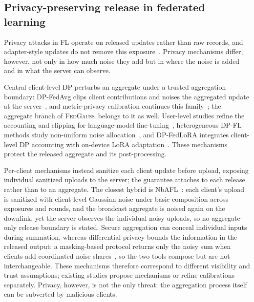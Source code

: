 \documentclass[a4paper,fleqn]{cas-dc}
\newcommand{\method}{\textsc{FedGauss}}
\begin{document}
\subsection{Privacy-preserving release in federated learning}
\par
Privacy attacks in FL operate on released updates rather than raw records, and adapter-style updates do not remove this exposure~\cite{shokri2017membership,nasr2019comprehensive,zhu2019deep,geiping2020inverting,carlini2022membership,tan2024reconstruction,sami2025adapter}. Privacy mechanisms differ, however, not only in how much noise they add but in where the noise is added and in what the server can observe.
\par
Central client-level DP perturbs an aggregate under a trusted aggregation boundary: DP-FedAvg clips client contributions and noises the aggregated update at the server~\cite{mcmahan2018dpfedavg}, and metric-privacy calibration continues this family~\cite{sainz2026metric}; the aggregate branch of \method\ belongs to it as well. User-level studies refine the accounting and clipping for language-model fine-tuning~\cite{chua2024mind,charles2024user}, heterogeneous DP-FL methods study non-uniform noise allocation~\cite{malek2024noiseaware}, and DP-FedLoRA integrates client-level DP accounting with on-device LoRA adaptation~\cite{xu2025dpfedlora}. These mechanisms protect the released aggregate and its post-processing.
\par
Per-client mechanisms instead sanitize each client update before upload, exposing individual sanitized uploads to the server; the guarantee attaches to each release rather than to an aggregate. The closest hybrid is NbAFL~\cite{wei2020federateddp}: each client's upload is sanitized with client-level Gaussian noise under basic composition across exposures and rounds, and the broadcast aggregate is noised again on the downlink, yet the server observes the individual noisy uploads, so no aggregate-only release boundary is stated. Secure aggregation can conceal individual inputs during summation, whereas differential privacy bounds the information in the released output: a masking-based protocol returns only the noisy sum when clients add coordinated noise shares~\cite{bonawitz2017secure}, so the two tools compose but are not interchangeable. These mechanisms therefore correspond to different visibility and trust assumptions; existing studies propose mechanisms or refine calibrations separately. Privacy, however, is not the only threat: the aggregation process itself can be subverted by malicious clients.
\par
\end{document}
